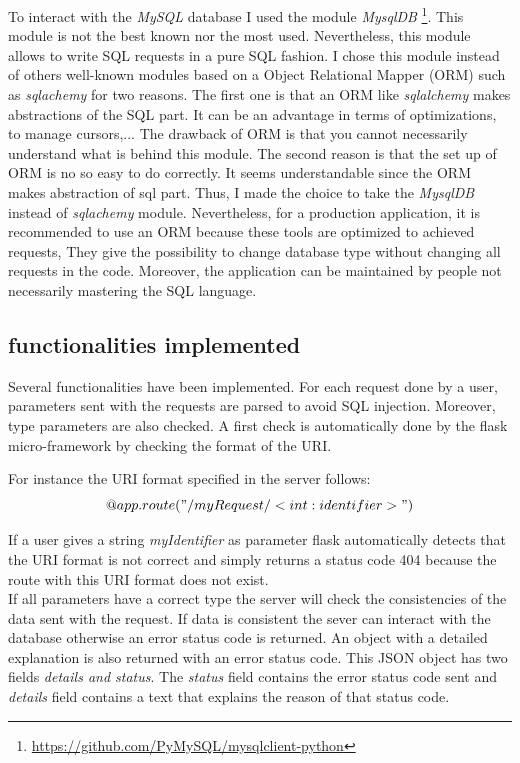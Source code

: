 To interact with the \textit{MySQL} database I used the module \textit{MysqlDB} \footnote{\url{https://github.com/PyMySQL/mysqlclient-python}}. This module is not the best known nor the most used. Nevertheless, this module allows to write SQL requests in a pure SQL fashion. I chose this module instead of others well-known modules based on a Object Relational Mapper (ORM) such as \textit{sqlachemy} for two reasons. The first one is that an ORM like \textit{sqlalchemy} makes abstractions of the SQL part. It can be an advantage in terms of optimizations, to manage cursors,... The drawback of ORM is that you cannot necessarily understand what is behind this module. The second reason is that the set up of ORM is no so easy to do correctly. It seems understandable since the ORM makes abstraction of sql part. Thus, I made the choice to take the \textit{MysqlDB} instead of \textit{sqlachemy} module. Nevertheless, for a production application, it is recommended to use an ORM because these tools are optimized to achieved requests, They give the possibility to change database type without changing all requests in the code. Moreover, the application can be maintained by people not necessarily mastering the SQL language.
\subsection{functionalities implemented}
Several functionalities have been implemented. For each request done by a user, parameters sent with the requests are parsed to avoid SQL injection. Moreover, type parameters are also checked. A first check is automatically  done by the flask micro-framework by checking the format of the URI.

For instance the URI format specified in the server follows:
$$ @app.route("/myRequest/<int:identifier>")$$

If a user gives a string \textit{myIdentifier} as parameter flask automatically detects that the URI format is not correct and simply returns a status code 404 because the route with this URI format does not exist.\\

If all parameters have a correct type the server will check the consistencies of the data sent with the request. If data is consistent the sever can interact with the database otherwise an error status code is returned. An object with a detailed explanation is also returned with an error status code. This JSON object has two fields \textit{details and status}. The \textit{status} field contains the error status code sent and \textit{details} field contains a text that explains the reason of that status code.
 
